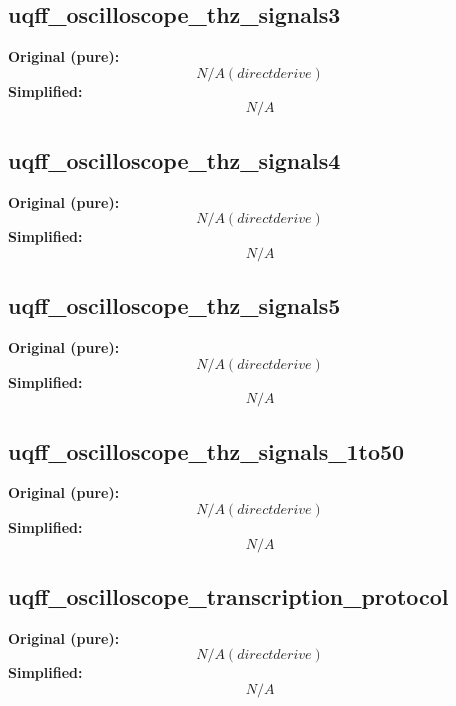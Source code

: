 \subsection{uqff_oscilloscope_thz_signals3}
\textbf{Original (pure):}
\begin{equation}
N/A (direct derive)
\end{equation}
\textbf{Simplified:}
\begin{equation}
N/A
\end{equation}

\subsection{uqff_oscilloscope_thz_signals4}
\textbf{Original (pure):}
\begin{equation}
N/A (direct derive)
\end{equation}
\textbf{Simplified:}
\begin{equation}
N/A
\end{equation}

\subsection{uqff_oscilloscope_thz_signals5}
\textbf{Original (pure):}
\begin{equation}
N/A (direct derive)
\end{equation}
\textbf{Simplified:}
\begin{equation}
N/A
\end{equation}

\subsection{uqff_oscilloscope_thz_signals_1to50}
\textbf{Original (pure):}
\begin{equation}
N/A (direct derive)
\end{equation}
\textbf{Simplified:}
\begin{equation}
N/A
\end{equation}

\subsection{uqff_oscilloscope_transcription_protocol}
\textbf{Original (pure):}
\begin{equation}
N/A (direct derive)
\end{equation}
\textbf{Simplified:}
\begin{equation}
N/A
\end{equation}

